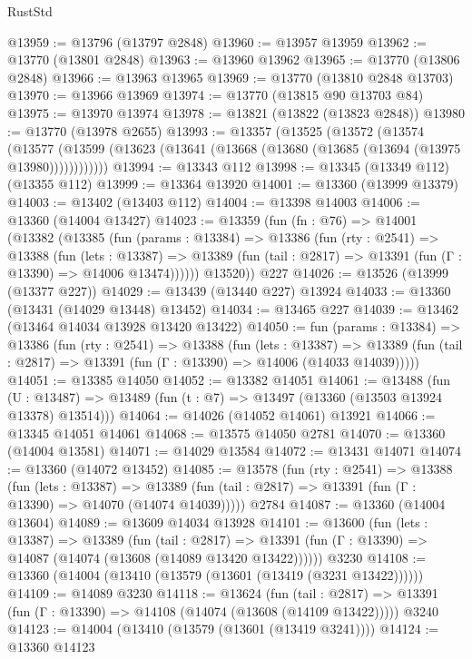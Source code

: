 \begin{lexlean}{RustStd}
\begin{coremodule}
@13959 := @13796 (@13797 @2848)
@13960 := @13957 @13959
@13962 := @13770 (@13801 @2848)
@13963 := @13960 @13962
@13965 := @13770 (@13806 @2848)
@13966 := @13963 @13965
@13969 := @13770 (@13810 @2848 @13703)
@13970 := @13966 @13969
@13974 := @13770 (@13815 @90 @13703 @84)
@13975 := @13970 @13974
@13978 := @13821 (@13822 (@13823 @2848))
@13980 := @13770 (@13978 @2655)
@13993 := @13357
    (@13525
      (@13572
        (@13574
          (@13577 (@13599 (@13623 (@13641 (@13668 (@13680 (@13685 (@13694 (@13975 @13980))))))))))))
@13994 := @13343 @112
@13998 := @13345 (@13349 @112) (@13355 @112)
@13999 := @13364 @13920
@14001 := @13360 (@13999 @13379)
@14003 := @13402 (@13403 @112)
@14004 := @13398 @14003
@14006 := @13360 (@14004 @13427)
@14023 := @13359
    (fun (fn : @76) =>
    @14001
      (@13382
        (@13385
          (fun (params : @13384) =>
          @13386
            (fun (rty : @2541) =>
            @13388
              (fun (lets : @13387) =>
              @13389 (fun (tail : @2817) => @13391 (fun (Γ : @13390) => @14006 @13474))))))
        @13520))
    @227
@14026 := @13526 (@13999 (@13377 @227))
@14029 := @13439 (@13440 @227) @13924
@14033 := @13360 (@13431 (@14029 @13448) @13452)
@14034 := @13465 @227
@14039 := @13462 (@13464 @14034 @13928 @13420 @13422)
@14050 := fun (params : @13384) =>
  @13386
    (fun (rty : @2541) =>
    @13388
      (fun (lets : @13387) =>
      @13389 (fun (tail : @2817) => @13391 (fun (Γ : @13390) => @14006 (@14033 @14039)))))
@14051 := @13385 @14050
@14052 := @13382 @14051
@14061 := @13488
    (fun (U : @13487) => @13489 (fun (t : @7) => @13497 (@13360 (@13503 @13924 @13378) @13514)))
@14064 := @14026 (@14052 @14061) @13921
@14066 := @13345 @14051 @14061
@14068 := @13575 @14050 @2781
@14070 := @13360 (@14004 @13581)
@14071 := @14029 @13584
@14072 := @13431 @14071
@14074 := @13360 (@14072 @13452)
@14085 := @13578
    (fun (rty : @2541) =>
    @13388
      (fun (lets : @13387) =>
      @13389 (fun (tail : @2817) => @13391 (fun (Γ : @13390) => @14070 (@14074 @14039)))))
    @2784
@14087 := @13360 (@14004 @13604)
@14089 := @13609 @14034 @13928
@14101 := @13600
    (fun (lets : @13387) =>
    @13389
      (fun (tail : @2817) =>
      @13391 (fun (Γ : @13390) => @14087 (@14074 (@13608 (@14089 @13420 @13422))))))
    @3230
@14108 := @13360 (@14004 (@13410 (@13579 (@13601 (@13419 (@3231 @13422))))))
@14109 := @14089 @3230
@14118 := @13624
    (fun (tail : @2817) => @13391 (fun (Γ : @13390) => @14108 (@14074 (@13608 (@14109 @13422)))))
    @3240
@14123 := @14004 (@13410 (@13579 (@13601 (@13419 @3241))))
@14124 := @13360 @14123

\end{coremodule}
\end{lexlean}
